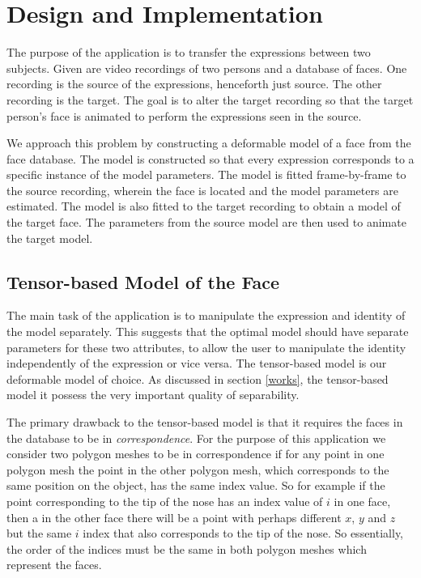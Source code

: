 \documentclass[11pt,a4paper]{report}
\begin{document}
\chapter{Design and Implementation}

The purpose of the application is to transfer the expressions between two
subjects. Given are video recordings of two persons and a database of
faces. One recording is the source of the expressions, henceforth just source. The
other recording is the target. The goal is to alter the target recording so that
the target person's face is animated to perform the expressions seen in the
source.

We approach this problem by constructing a deformable model of a face from the
face database. The model is constructed so that every expression corresponds to a specific instance of the model
parameters. The model is fitted frame-by-frame to the source recording, wherein
the face is located and the model parameters are estimated. The model
is also fitted to the target recording to obtain a model of the target face. The
parameters from the source model are then used to animate the target model.

\section{Tensor-based Model of the Face}
The main task of the application is to manipulate the expression and
identity of the model separately. This suggests that the optimal model should have
separate parameters for these two attributes, to allow the user to manipulate
the identity independently of the expression or vice versa.
The tensor-based model is our deformable model of choice. As discussed in
section \ref{works}, the tensor-based model it possess the very
important quality of separability.

The primary drawback to the tensor-based model is that it requires the faces in
the database to be in \textit{correspondence}. For the purpose of this
application we consider two polygon meshes to be in correspondence
if for any point in one polygon mesh the point in the other polygon mesh, which corresponds to the
same position on the object, has the same index value. So for example if the
point corresponding to the tip of the nose has an index value of $i$ in one
face, then a in the other face there  will be a point with perhaps
different $x$, $y$ and $z$ but the same $i$ index that also corresponds to the
tip of the nose. So essentially, the order of the indices must be the same in both
polygon meshes which represent the faces. 
\end{document}
